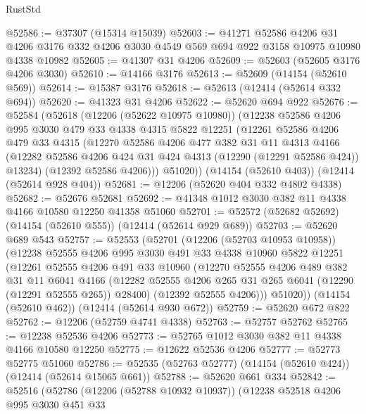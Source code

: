 \begin{lexlean}{RustStd}
\begin{coremodule}
@52586 := @37307 (@15314 @15039)
@52603 := @41271
    @52586
    @4206
    @31
    @4206
    @3176
    @332
    @4206
    @3030
    @4549
    @569
    @694
    @922
    @3158
    @10975
    @10980
    @4338
    @10982
@52605 := @41307 @31 @4206
@52609 := @52603 (@52605 @3176 @4206 @3030)
@52610 := @14166 @3176
@52613 := @52609 (@14154 (@52610 @569))
@52614 := @15387 @3176
@52618 := @52613 (@12414 (@52614 @332 @694))
@52620 := @41323 @31 @4206
@52622 := @52620 @694 @922
@52676 := @52584
    (@52618
      (@12206 (@52622 @10975 @10980))
      (@12238
        @52586
        @4206
        @995
        @3030
        @479
        @33
        @4338
        @4315
        @5822
        @12251
        (@12261
          @52586
          @4206
          @479
          @33
          @4315
          (@12270
            @52586
            @4206
            @477
            @382
            @31
            @11
            @4313
            @4166
            (@12282 @52586 @4206 @424 @31 @424 @4313 (@12290 (@12291 @52586 @424)) @13234)
            (@12392 @52586 @4206)))
        @51020))
    (@14154 (@52610 @403))
    (@12414 (@52614 @928 @404))
@52681 := @12206 (@52620 @404 @332 @4802 @4338)
@52682 := @52676 @52681
@52692 := @41348 @1012 @3030 @382 @11 @4338 @4166 @10580 @12250 @41358 @51060
@52701 := @52572 (@52682 @52692) (@14154 (@52610 @555)) (@12414 (@52614 @929 @689))
@52703 := @52620 @689 @543
@52757 := @52553
    (@52701
      (@12206 (@52703 @10953 @10958))
      (@12238
        @52555
        @4206
        @995
        @3030
        @491
        @33
        @4338
        @10960
        @5822
        @12251
        (@12261
          @52555
          @4206
          @491
          @33
          @10960
          (@12270
            @52555
            @4206
            @489
            @382
            @31
            @11
            @6041
            @4166
            (@12282 @52555 @4206 @265 @31 @265 @6041 (@12290 (@12291 @52555 @265)) @28400)
            (@12392 @52555 @4206)))
        @51020))
    (@14154 (@52610 @462))
    (@12414 (@52614 @930 @672))
@52759 := @52620 @672 @822
@52762 := @12206 (@52759 @4741 @4338)
@52763 := @52757 @52762
@52765 := @12238 @52536 @4206
@52773 := @52765 @1012 @3030 @382 @11 @4338 @4166 @10580 @12250
@52775 := @12622 @52536 @4206
@52777 := @52773 @52775 @51060
@52786 := @52535 (@52763 @52777) (@14154 (@52610 @424)) (@12414 (@52614 @15065 @661))
@52788 := @52620 @661 @334
@52842 := @52516
    (@52786
      (@12206 (@52788 @10932 @10937))
      (@12238
        @52518
        @4206
        @995
        @3030
        @451
        @33

\end{coremodule}
\end{lexlean}
